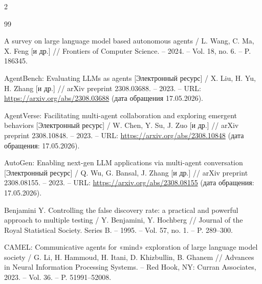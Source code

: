 
\renewcommand{\refname}{\mbox{Библиографический} \mbox{список}}

\begingroup
\footnotesize
\setlength{\itemsep}{1pt}
\begin{multicols}{2}
\begin{thebibliography}{99}

A survey on large language model based autonomous agents
/ L. Wang, C. Ma, X. Feng [и др.] // Frontiers of Computer Science.
-- 2024. -- Vol. 18, no. 6. -- P. 186345.

AgentBench: Evaluating LLMs as agents [Электронный ресурс]
/ X. Liu, H. Yu, H. Zhang [и др.] // arXiv preprint 2308.03688.
-- 2023. -- URL: \url{https://arxiv.org/abs/2308.03688} (дата
обращения 17.05.2026).

AgentVerse: Facilitating multi-agent collaboration and exploring
emergent behaviors [Электронный ресурс] / W. Chen, Y. Su, J. Zuo
[и др.] // arXiv preprint 2308.10848. -- 2023.
-- URL: \url{https://arxiv.org/abs/2308.10848} (дата обращения: 17.05.2026).

AutoGen: Enabling next-gen LLM applications via multi-agent
conversation [Электронный ресурс] / Q. Wu, G. Bansal, J. Zhang
[и др.] // arXiv preprint 2308.08155. -- 2023.
-- URL: \url{https://arxiv.org/abs/2308.08155} (дата обращения: 17.05.2026).

Benjamini Y. Controlling the false discovery rate: a practical
and powerful approach to multiple testing / Y. Benjamini,
Y. Hochberg // Journal of the Royal Statistical Society.
Series B. -- 1995. -- Vol. 57, no. 1. -- P. 289--300.

CAMEL: Communicative agents for «mind» exploration of large
language model society / G. Li, H. Hammoud, H. Itani, D. Khizbullin,
B. Ghanem // Advances in Neural Information Processing Systems.
-- Red Hook, NY: Curran Associates, 2023. -- Vol. 36.
-- P. 51991--52008.


\end{thebibliography}
\end{multicols}
